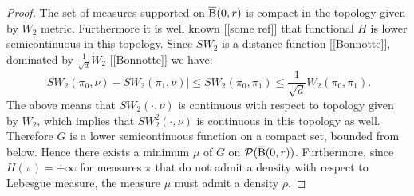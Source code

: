 \begin{proof}
The set of measures supported on $\operatorname{\overline{B}}(0,r)$ is compact in the topology given by $W_2$ metric. Furthermore it is well known [[some ref]] that functional $H$ is lower semicontinuous in this topology. Since $SW_2$ is a distance function [[Bonnotte]], dominated by $\frac{1}{\sqrt{d}} W_2$ [[Bonnotte]] we have:
\[
|SW_2(\pi_0, \nu) - SW_2(\pi_1, \nu)| \leq SW_2(\pi_0, \pi_1) \leq \frac{1}{\sqrt{d}}W_2(\pi_0, \pi_1).
\]
The above means that $SW_2(\cdot, \nu)$ is continuous with respect to topology given by $W_2$, which implies that $SW_2^2(\cdot, \nu)$ is continuous in this topology as well. Therefore $G$ is a lower semicontinuous function on a compact set, bounded from below. Hence there exists a minimum  $\mu$ of $G$ on $\mathcal{P}(\operatorname{\overline{B}}(0,r))$. Furthermore, since $H(\pi) = +\infty$  for measures $\pi$ that do not admit a density with respect to Lebesgue measure, the measure $\mu$ must admit a density $\rho$.


\end{proof}
